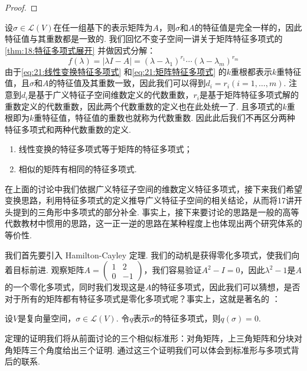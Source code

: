 \begin{proof}

\end{proof}

设$\sigma\in\mathcal{L}(V)$在任一组基下的表示矩阵为$A$，则$\sigma$和$A$的特征值是完全一样的，因此特征值与其重数都是一致的. 我们回忆不变子空间一讲关于矩阵特征多项式的\autoref{thm:18:特征多项式展开} 并做因式分解：
\begin{equation}\label{eq:21:矩阵特征多项式}
    f(\lambda)=|\lambda I-A|=(\lambda-\lambda_1)^{r_1}\cdots(\lambda-\lambda_m)^{r_m}
\end{equation}
由于\autoref{eq:21:线性变换特征多项式} 和\autoref{eq:21:矩阵特征多项式} 的$k$重根都表示$k$重特征值，且$\sigma$和$A$的特征值及其重数一致，因此我们可以得到$d_i=r_i(i=1,\ldots,m)$. 注意到$d_i$是基于广义特征子空间维数定义的代数重数，$r_i$是基于矩阵特征多项式解的重数定义的代数重数，因此两个代数重数的定义也在此处统一了. 且多项式的$k$重根即为$k$重特征值，特征值的重数也就称为代数重数. 因此此后我们不再区分两种特征多项式和两种代数重数的定义.

\begin{corollary}
    \begin{enumerate}
        \item 线性变换的特征多项式等于矩阵的特征多项式；
        \item 相似的矩阵有相同的特征多项式.
    \end{enumerate}
\end{corollary}

在上面的讨论中我们依据广义特征子空间的维数定义特征多项式，接下来我们希望变换思路，利用特征多项式的定义推导广义特征子空间的相关结论，从而将17讲开头提到的三角形中多项式的部分补全. 事实上，接下来要讨论的思路是一般的高等代数教材中惯用的思路，这一正一逆的思路在某种程度上也体现出两个研究体系的等价性.

我们首先要引入 Hamilton-Cayley 定理. 我们的动机是获得零化多项式，使我们向着目标前进. 观察矩阵$A=\begin{pmatrix}
        1 & 2 \\ 0 & -1
    \end{pmatrix}$，我们容易验证$A^2-I=0$，因此$\lambda^2-1$是$A$的一个零化多项式，同时我们发现这是$A$的特征多项式，因此我们可以猜想，是否对于所有的矩阵都有特征多项式是零化多项式呢？事实上，这就是著名的 ：
\begin{theorem} \label{thm:21:HC} 
    设$V$是复向量空间，$\sigma\in \mathcal{L}(V)$. 令$q$表示$\sigma$的特征多项式，则$q(\sigma)=0$.
\end{theorem}
定理的证明我们将从前面讨论的三个相似标准形：对角矩阵，上三角矩阵和分块对角矩阵三个角度给出三个证明. 通过这三个证明我们可以体会到标准形与多项式背后的联系.

